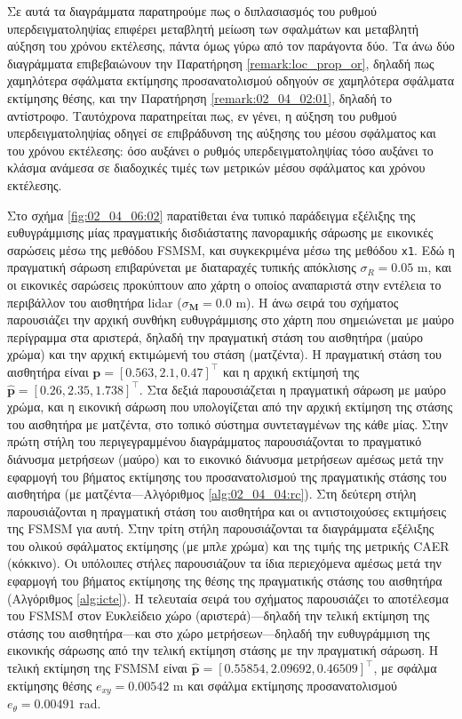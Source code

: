 Σε αυτά τα διαγράμματα παρατηρούμε πως ο διπλασιασμός του ρυθμού
υπερδειγματοληψίας επιφέρει μεταβλητή μείωση των σφαλμάτων και μεταβλητή αύξηση
του χρόνου εκτέλεσης, πάντα όμως γύρω από τον παράγοντα δύο. Τα άνω δύο
διαγράμματα επιβεβαιώνουν την Παρατήρηση \ref{remark:loc_prop_or}, δηλαδή πως
χαμηλότερα σφάλματα εκτίμησης προσανατολισμού οδηγούν σε χαμηλότερα σφάλματα
εκτίμησης θέσης, και την Παρατήρηση \ref{remark:02_04_02:01}, δηλαδή το
αντίστροφο. Ταυτόχρονα παρατηρείται πως, εν γένει, η αύξηση του ρυθμού
υπερδειγματοληψίας οδηγεί σε επιβράδυνση της αύξησης του μέσου σφάλματος και
του χρόνου εκτέλεσης: όσο αυξάνει ο ρυθμός υπερδειγματοληψίας τόσο  αυξάνει το
κλάσμα ανάμεσα σε διαδοχικές τιμές των μετρικών μέσου σφάλματος και χρόνου
εκτέλεσης.


Στο σχήμα \ref{fig:02_04_06:02} παρατίθεται ένα τυπικό παράδειγμα εξέλιξης της
ευθυγράμμισης μίας πραγματικής δισδιάστατης πανοραμικής σάρωσης με εικονικές
σαρώσεις μέσω της μεθόδου FSMSM, και συγκεκριμένα μέσω της μεθόδου \texttt{x1}.
Εδώ η πραγματική σάρωση επιβαρύνεται με διαταραχές τυπικής απόκλισης $\sigma_R
= 0.05$ m, και οι εικονικές σαρώσεις προκύπτουν απο χάρτη ο οποίος αναπαριστά
στην εντέλεια το περιβάλλον του αισθητήρα lidar ($\sigma_{\bm{M}} = 0.0$ m). Η
άνω σειρά του σχήματος παρουσιάζει την αρχική συνθήκη ευθυγράμμισης στο χάρτη
που σημειώνεται με μαύρο περίγραμμα στα αριστερά, δηλαδή την πραγματική στάση
του αισθητήρα (μαύρο χρώμα) και την αρχική εκτιμώμενή του στάση (ματζέντα). Η
πραγματική στάση του αισθητήρα είναι $\bm{p} = [0.563, 2.1, 0.47]^\top$ και η
αρχική εκτίμησή της $\hat{\bm{p}} = [0.26, 2.35, 1.738]^\top$. Στα δεξιά
παρουσιάζεται η πραγματική σάρωση με μαύρο χρώμα, και η εικονική σάρωση που
υπολογίζεται από την αρχική εκτίμηση της στάσης του αισθητήρα με ματζέντα, στο
τοπικό σύστημα συντεταγμένων της κάθε μίας. Στην πρώτη στήλη του
περιγεγραμμένου διαγράμματος παρουσιάζονται το πραγματικό διάνυσμα μετρήσεων
(μαύρο) και το εικονικό διάνυσμα μετρήσεων αμέσως μετά την εφαρμογή του βήματος
εκτίμησης του προσανατολισμού της πραγματικής στάσης του αισθητήρα (με
ματζέντα---Αλγόριθμος \ref{alg:02_04_04:rc}). Στη δεύτερη στήλη παρουσιάζονται
η πραγματική στάση του αισθητήρα και οι αντιστοιχούσες εκτιμήσεις της FSMSM για
αυτή. Στην τρίτη στήλη παρουσιάζονται τα διαγράμματα εξέλιξης του ολικού
σφάλματος εκτίμησης (με μπλε χρώμα) και της τιμής της μετρικής CAER (κόκκινο).
Οι υπόλοιπες στήλες παρουσιάζουν τα ίδια περιεχόμενα αμέσως μετά την εφαρμογή
του βήματος εκτίμησης της θέσης της πραγματικής στάσης του αισθητήρα
(Αλγόριθμος \ref{alg:icte}).  Η τελευταία σειρά του σχήματος παρουσιάζει το
αποτέλεσμα του FSMSM στον Ευκλείδειο χώρο (αριστερά)---δηλαδή την τελική
εκτίμηση της στάσης του αισθητήρα---και στο χώρο μετρήσεων---δηλαδή την
ευθυγράμμιση της εικονικής σάρωσης από την τελική εκτίμηση στάσης με την
πραγματική σάρωση. Η τελική εκτίμηση της FSMSM είναι $\hat{\bm{p}} = [0.55854,
2.09692, 0.46509]^\top$, με σφάλμα εκτίμησης θέσης $e_{xy} = 0.00542$ m και
σφάλμα εκτίμησης προσανατολισμού $e_{\theta} = 0.00491$ rad.

